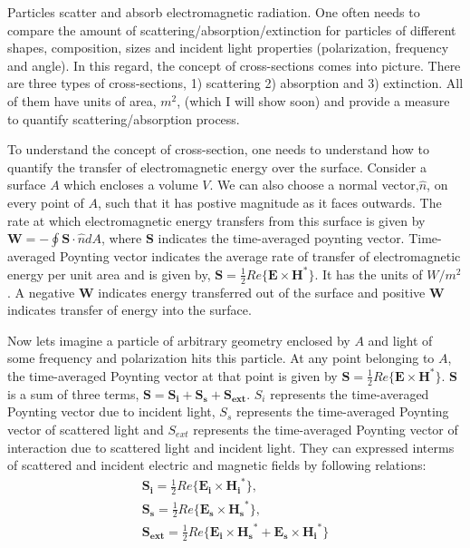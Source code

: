 \documentclass{article}
\begin{document}
Particles scatter and absorb electromagnetic radiation. One often needs to compare the amount of scattering/absorption/extinction for particles of different shapes, composition, sizes and incident light properties (polarization, frequency and angle). In this regard, the concept of cross-sections comes into picture. There are three types of cross-sections, 1) scattering 2) absorption and 3) extinction. All of them have units of area, $m^2$, (which I will show soon) and provide a measure to quantify scattering/absorption process. 

To understand the concept of cross-section, one needs to understand how to quantify the transfer of electromagnetic energy over the surface. Consider a surface $A$ which encloses a volume $V$. We can also choose a normal vector,$\hat{n}$, on every point of $A$, such that it has postive magnitude as it faces outwards. The rate at which electromagnetic energy transfers from this surface is given by $\bm{W}=-\oint\bm{S} \cdot \hat{n} dA$, where $\bm{S}$ indicates the time-averaged poynting vector. Time-averaged Poynting vector indicates the average rate of transfer of electromagnetic energy per unit area and is given by, $\bm{S}=\frac{1}{2}Re\{\bm{E} \times \bm{H}^*\}$. It has the units of $W/m^2$. A negative $\bm{W}$ indicates energy transferred out of the surface and positive $\bm{W}$ indicates transfer of energy into the surface. 

Now lets imagine a particle of arbitrary geometry enclosed by $A$ and light of some frequency and polarization hits this particle. At any point belonging to $A$, the time-averaged Poynting vector at that point is given by $\bm{S}=\frac{1}{2}Re\{\bm{E} \times \bm{H}^*\}$. $\bm{S}$ is a sum of three terms, $\bm{S}=\bm{S_i}+\bm{S_s}+\bm{S_{ext}}$. $S_i$ represents the time-averaged Poynting vector due to incident light, $S_s$ represents the time-averaged Poynting vector of scattered light and $S_{ext}$ represents the time-averaged Poynting vector of interaction due to scattered light and incident light. They can expressed interms of scattered and incident electric and magnetic fields by following relations:
\begin{align*}
\bm{S_i}=\frac{1}{2}Re\{\bm{E_i} \times \bm{H_i}^*\},\\
\bm{S_s}=\frac{1}{2}Re\{\bm{E_s} \times \bm{H_s}^*\},\\
\bm{S_{ext}}=\frac{1}{2}Re\{\bm{E_i} \times \bm{H_s}^*+\bm{E_s} \times \bm{H_i}^*\}
\end{align*}
\end{document}
